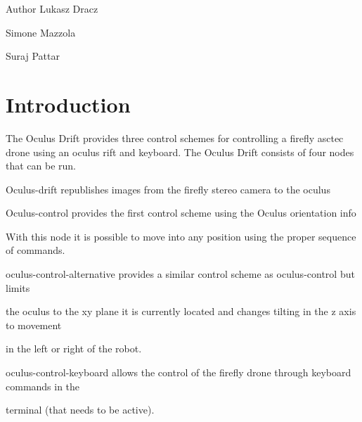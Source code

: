 \begin{DoxyAuthor}{Author}
Lukasz Dracz 

Simone Mazzola 

Suraj Pattar
\end{DoxyAuthor}
\hypertarget{index_intro_sec}{}\section{Introduction}\label{index_intro_sec}
The Oculus Drift provides three control schemes for controlling a firefly asctec drone using an oculus rift and keyboard. The Oculus Drift consists of four nodes that can be run.

Oculus-\/drift republishes images from the firefly stereo camera to the oculus

Oculus-\/control provides the first control scheme using the Oculus orientation info

With this node it is possible to move into any position using the proper sequence of commands.

oculus-\/control-\/alternative provides a similar control scheme as oculus-\/control but limits

the oculus to the xy plane it is currently located and changes tilting in the z axis to movement

in the left or right of the robot.

oculus-\/control-\/keyboard allows the control of the firefly drone through keyboard commands in the

terminal (that needs to be active). 